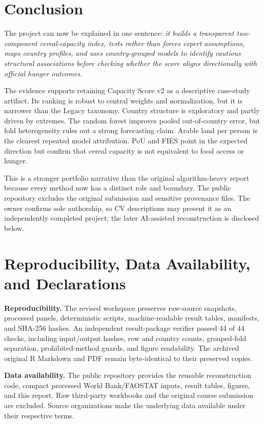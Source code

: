 \documentclass[11pt]{article}
\begin{document}
\section{Conclusion}

The project can now be explained in one sentence: \emph{it builds a transparent two-component cereal-capacity index, tests rather than forces expert assumptions, maps country profiles, and uses country-grouped models to identify cautious structural associations before checking whether the score aligns directionally with official hunger outcomes.}

The evidence supports retaining Capacity Score v2 as a descriptive case-study artifact. Its ranking is robust to central weights and normalization, but it is narrower than the Legacy taxonomy. Country structure is exploratory and partly driven by extremes. The random forest improves pooled out-of-country error, but fold heterogeneity rules out a strong forecasting claim. Arable land per person is the clearest repeated model attribution. PoU and FIES point in the expected direction but confirm that cereal capacity is not equivalent to food access or hunger.

This is a stronger portfolio narrative than the original algorithm-heavy report because every method now has a distinct role and boundary. The public repository excludes the original submission and sensitive provenance files. The owner confirms sole authorship, so CV descriptions may present it as an independently completed project; the later AI-assisted reconstruction is disclosed below.

\section*{Reproducibility, Data Availability, and Declarations}

\textbf{Reproducibility.} The revised workspace preserves raw-source snapshots, processed panels, deterministic scripts, machine-readable result tables, manifests, and SHA-256 hashes. An independent result-package verifier passed 44 of 44 checks, including input/output hashes, row and country counts, grouped-fold separation, prohibited-method guards, and figure readability. The archived original R Markdown and PDF remain byte-identical to their preserved copies.

\textbf{Data availability.} The public repository provides the reusable reconstruction code, compact processed World Bank/FAOSTAT inputs, result tables, figures, and this report. Raw third-party workbooks and the original course submission are excluded. Source organizations make the underlying data available under their respective terms.
\end{document}
